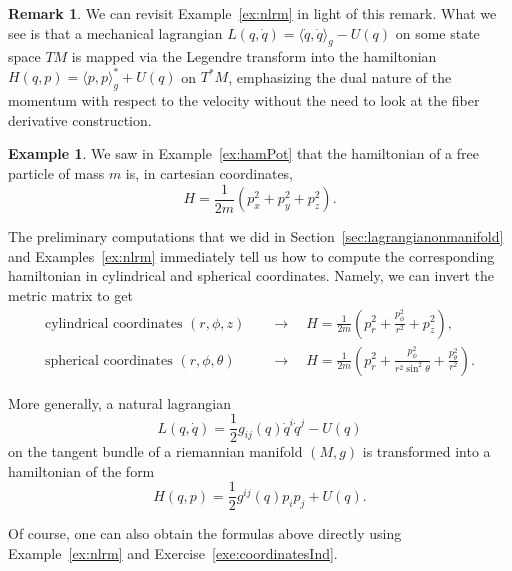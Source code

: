 \documentclass[english,fontsize=11pt,paper=b5]{scrbook}
\theoremstyle{definition}
\newtheorem{remark}{Remark}[chapter]
\newtheorem{example}{Example}[chapter]
\begin{document}
\begin{remark}
      We can revisit Example~\ref{ex:nlrm} in light of this remark. What we see is that a mechanical lagrangian $L(q,\dot q) = \langle \dot q, \dot q\rangle_g - U(q)$ on some state space $TM$ is mapped via the Legendre transform into the hamiltonian $H(q, p) = \langle p, p \rangle_g^* + U(q)$ on $T^*M$, emphasizing the dual nature of the momentum with respect to the velocity without the need to look at the fiber derivative construction.
    \end{remark}

    \begin{example}
      We saw in Example~\ref{ex:hamPot} that the hamiltonian of a free particle of mass $m$ is, in cartesian coordinates,
      \begin{equation}
        H = \frac{1}{2m}(p_x^2 + p_y^2 + p_z^2).
      \end{equation}

      The preliminary computations that we did in Section~\ref{sec:lagrangianonmanifold} and Examples~\ref{ex:nlrm} immediately tell us how to compute the corresponding hamiltonian in cylindrical and spherical coordinates.
      Namely, we can invert the metric matrix to get
      \begin{align}
        \mbox{cylindrical coordinates } (r,\phi,z) \quad    & \rightarrow\quad H = \frac 1{2m} \left(p_r^2 + \frac{p_\phi^2}{r^2} + p_z^2\right),                               \\
        \mbox{spherical coordinates } (r,\phi,\theta) \quad & \rightarrow\quad H = \frac 1{2m} \left(p_r^2 + \frac{p_\phi^2}{r^2\sin^2\theta} + \frac{p_\theta^2}{r^2} \right).
      \end{align}

      More generally, a natural lagrangian
      \begin{equation}
        L(q,\dot q) = \frac 12 g_{ij}(q) \dot q^i \dot q^j - U(q)
      \end{equation}
      on the tangent bundle of a riemannian manifold $(M,g)$ is transformed into a hamiltonian of the form
      \begin{equation}
        H(q,p) = \frac 12 g^{ij}(q) p_i p_j + U(q).
      \end{equation}

      Of course, one can also obtain the formulas above directly using Example~\ref{ex:nlrm} and Exercise~\ref{exe:coordinatesInd}.
    \end{example}
\end{document}

